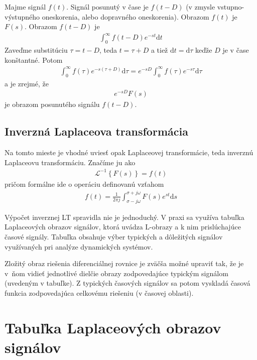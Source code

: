 \documentclass[a4paper, 10pt, ]{article}
\begin{document}
Majme signál $f(t)$. Signál posunutý v čase je $f(t-D)$ (v zmysle vstupno-výstupného oneskorenia, alebo dopravného oneskorenia). Obrazom $f(t)$ je $F(s)$. Obrazom $f(t-D)$ je
\begin{align}
    \int_0^\infty f(t-D) e^{-st} \text{d}t
\end{align}
Zaveďme substitúciu $\tau  = t-D$, teda $t=\tau+D$ a tiež $\text{d}t = \text{d}\tau$ keďže $D$ je v čase konštantné. Potom
\begin{align}
    \int_0^\infty f(\tau) e^{-s(\tau+D)} \text{d}\tau = e^{-sD} \int_0^\infty f(\tau) e^{-s\tau} \text{d}\tau
\end{align}
a je zrejmé, že
\begin{align}
    e^{-sD} F(s)
\end{align}
je obrazom posunutého signálu $f(t-D)$.




\subsection{Inverzná Laplaceova transformácia}

Na tomto mieste je vhodné uviesť opak Laplaceovej transformácie, teda inverznú Laplaceovu transformáciu. Značíme ju ako
\begin{align}
    \mathcal L ^{-1} \left\{ F(s) \right\} = f(t)
\end{align}
pričom formálne ide o operáciu definovanú vzťahom
\begin{align}
    f(t) = \frac{1}{2\pi j} \int_{\sigma-j\omega}^{\sigma + j\omega} F(s) e^{st} \text{d}s
\end{align}

Výpočet inverznej LT spravidla nie je jednoduchý. V praxi sa využíva tabuľka Laplaceových obrazov signálov, ktorá uvádza L-obrazy a k nim prislúchajúce časové signály. Tabuľka obsahuje výber typických a dôležitých signálov využívaných pri analýze dynamických systémov.

Zložitý obraz riešenia diferenciálnej rovnice je zväčša možné upraviť tak, že je v~ňom vidieť jednotlivé dielčie obrazy zodpovedajúce typickým signálom (uvedeným v tabuľke). Z typických časových signálov sa potom vyskladá časová funkcia zodpovedajúca celkovému riešeniu (v časovej oblasti).






\section{Tabuľka Laplaceových obrazov signálov}
\end{document}
